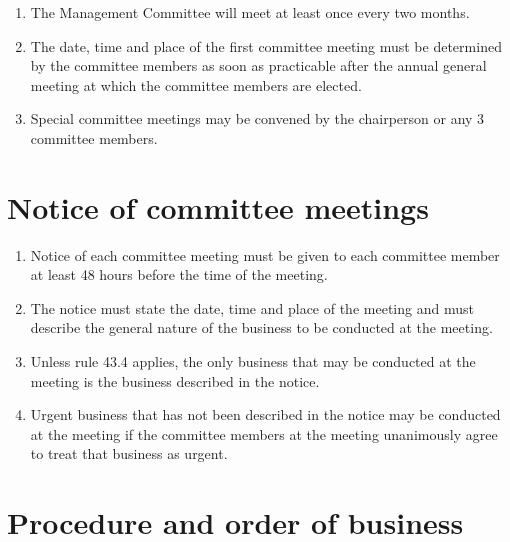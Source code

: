 \begin{enumerate}

\item The Management Committee will meet at least once every two months.
\item The date, time and place of the first committee meeting must be determined by the committee members as soon as practicable after the annual general meeting at which the committee members are elected.
\item Special committee meetings may be convened by the chairperson or any 3 committee members.
\end{enumerate}

\hypertarget{notice-of-committee-meetings}{%
\section{Notice of committee meetings}\label{notice-of-committee-meetings}}

\begin{enumerate}

\item Notice of each committee meeting must be given to each committee member at least 48 hours before the time of the meeting.
\item The notice must state the date, time and place of the meeting and must describe the general nature of the business to be conducted at the meeting.
\item Unless rule 43.4 applies, the only business that may be conducted at the meeting is the business described in the notice.
\item Urgent business that has not been described in the notice may be conducted at the meeting if the committee members at the meeting unanimously agree to treat that business as urgent.
\end{enumerate}

\hypertarget{procedure-and-order-of-business}{%
\section{Procedure and order of business}\label{procedure-and-order-of-business}}

